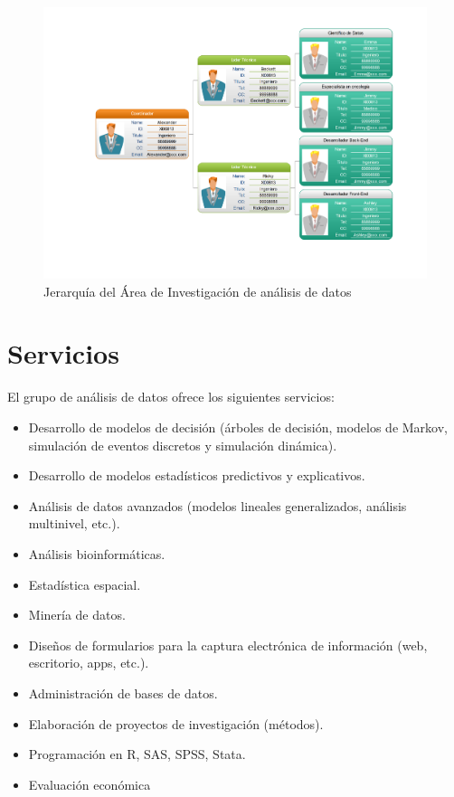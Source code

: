 \begin{center}
\begin{figure}[h!]
	\centering
	\includegraphics[width=1\linewidth]{ARQUITECTURA/imgs/organizacion}
	\caption{Jerarquía del  Área de Investigación de análisis de datos}
	\label{organigrama}
\end{figure}
\end{center}
\newpage
\section{Servicios}
El grupo de análisis de datos ofrece los siguientes servicios:
\begin{itemize}
	\item Desarrollo de modelos de decisión (árboles de decisión, modelos de Markov, simulación de eventos discretos y simulación dinámica).
	\item Desarrollo de modelos estadísticos predictivos y explicativos.
	\item Análisis de datos avanzados (modelos lineales generalizados, análisis multinivel, etc.).
	\item Análisis bioinformáticas.
	\item Estadística espacial.
	\item Minería de datos.
	\item Diseños de formularios para la captura electrónica de información (web, escritorio, apps, etc.).
	\item Administración de bases de datos.
	\item Elaboración de proyectos de investigación (métodos).
	\item Programación en R, SAS, SPSS, Stata.
	\item Evaluación económica
\end{itemize}



